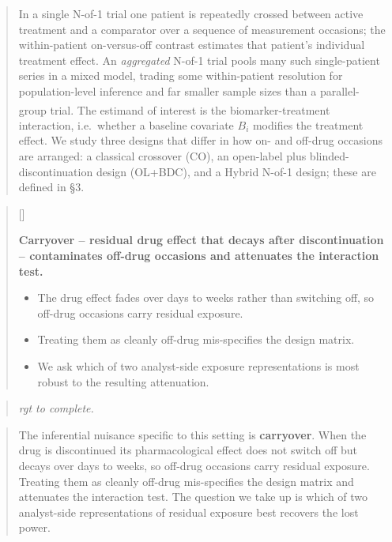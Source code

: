 \documentclass[
  11pt,
]{article}
\newcounter{pgraph}
\newenvironment{bullets}{%
  \stepcounter{pgraph}%
  \begin{quote}\small\sffamily\color[gray]{0.30}%
  {\normalfont\scriptsize\color[gray]{0.58}[\thepgraph]\enspace}}{%
  \end{quote}}
\newenvironment{rgt}{%
  \begin{quote}\small\itshape\color[RGB]{20,60,160}}{%
  \end{quote}}
\newenvironment{orig}{%
  \begin{quote}\normalsize\color[gray]{0.55}}{%
  \end{quote}}
\begin{document}
\begin{orig}
In a single N-of-1 trial one patient is repeatedly crossed between
active treatment and a comparator over a sequence of measurement
occasions; the within-patient on-versus-off contrast estimates that
patient's individual treatment effect. An \emph{aggregated} N-of-1 trial
pools many such single-patient series in a mixed model, trading some
within-patient resolution for population-level inference and far
smaller sample sizes than a parallel-group trial\textsuperscript{}. The estimand of interest is the
biomarker-treatment interaction, i.e.~whether a baseline covariate
\(B_i\) modifies the treatment effect. We study three designs that
differ in how on- and off-drug occasions are arranged: a classical
crossover (CO), an open-label plus blinded-discontinuation design
(OL+BDC), and a Hybrid N-of-1 design; these are defined in §3.

\end{orig}

\begin{bullets}

\textbf{Carryover -- residual drug effect that decays after
discontinuation -- contaminates off-drug occasions and attenuates
the interaction test.}

\begin{itemize}\setlength{\itemsep}{2pt}\setlength{\parskip}{0pt}
\item The drug effect fades over days to weeks rather than switching
off, so off-drug occasions carry residual exposure.
\item Treating them as cleanly off-drug mis-specifies the design
matrix.
\item We ask which of two analyst-side exposure representations is
most robust to the resulting attenuation.
\end{itemize}

\end{bullets}

\begin{rgt}
rgt to complete.

\end{rgt}

\begin{orig}
The inferential nuisance specific to this setting is \textbf{carryover}.
When the drug is discontinued its pharmacological effect does not
switch off but decays over days to weeks, so off-drug occasions
carry residual exposure. Treating them as cleanly off-drug
mis-specifies the design matrix and attenuates the interaction test.
The question we take up is which of two analyst-side representations
of residual exposure best recovers the lost power.

\end{orig}
\end{document}
